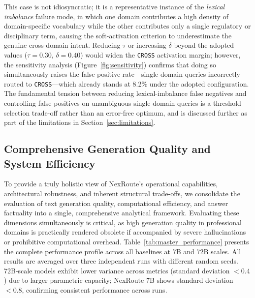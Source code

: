 \documentclass[a4paper,fleql]{cas-sc}
\begin{document}
This case is not idiosyncratic; it is a representative instance of the
\emph{lexical imbalance} failure mode, in which one domain contributes a high
density of domain-specific vocabulary while the other contributes only a single
regulatory or disciplinary term, causing the soft-activation criterion to
underestimate the genuine cross-domain intent. Reducing $\tau$ or increasing
$\delta$ beyond the adopted values ($\tau{=}0.30$, $\delta{=}0.40$) would
widen the \texttt{CROSS} activation margin; however, the sensitivity analysis
(Figure~\ref{fig:sensitivity}) confirms that doing so simultaneously raises the
false-positive rate---single-domain queries incorrectly routed to
\texttt{CROSS}---which already stands at 8.2\% under the adopted
configuration. The fundamental tension between reducing lexical-imbalance false
negatives and controlling false positives on unambiguous single-domain queries
is a threshold-selection trade-off rather than an error-free optimum, and is
discussed further as part of the limitations in Section~\ref{sec:limitations}.

\subsection{Comprehensive Generation Quality and System Efficiency}
\label{ssec:comprehensive}
To provide a truly holistic view of NexRoute's operational capabilities,
architectural robustness, and inherent structural trade-offs, we consolidate
the evaluation of text generation quality, computational efficiency, and answer
factuality into a single, comprehensive analytical framework. Evaluating these
dimensions simultaneously is critical, as high generation quality in
professional domains is practically rendered obsolete if accompanied by severe
hallucinations or prohibitive computational overhead.
Table~\ref{tab:master_performance} presents the complete performance profile
across all baselines at 7B and 72B scales. All results are averaged over
three independent runs with different random seeds. 72B-scale models exhibit
lower variance across metrics (standard deviation $< 0.4$) due to larger
parametric capacity; NexRoute 7B shows standard deviation $< 0.8$, confirming
consistent performance across runs.
\end{document}
